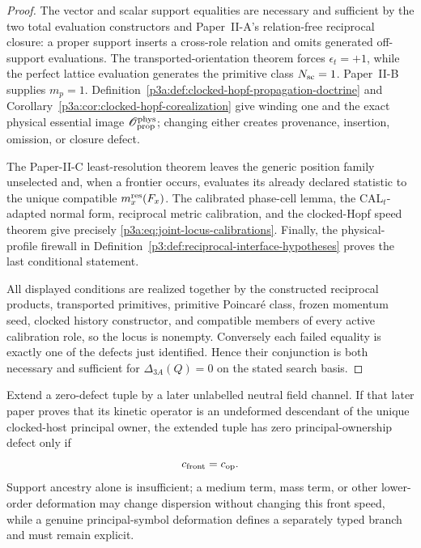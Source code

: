 \documentclass[12pt,a4paper]{article}
\begin{document}
\begin{proof}
The vector and scalar support equalities are necessary and sufficient by the
two total evaluation constructors and Paper~II-A's relation-free reciprocal
closure: a proper support inserts a cross-role relation and omits generated
off-support evaluations.  The transported-orientation theorem forces
\(\epsilon_t=+1\), while the perfect lattice evaluation generates the
primitive class \(N_{\rm sc}=1\).  Paper~II-B supplies \(m_p=1\).
Definition~\ref{p3a:def:clocked-hopf-propagation-doctrine} and
Corollary~\ref{p3a:cor:clocked-hopf-corealization} give winding one and the
exact physical essential image
\(\mathscr O_{\rm prop}^{\rm phys}\); changing either creates provenance,
insertion, omission, or closure defect.

The Paper-II-C least-resolution theorem leaves the generic position family
unselected and, when a frontier occurs, evaluates its already declared
statistic to the unique compatible \(m_x^{\rm res}(F_x)\).  The calibrated
phase-cell lemma, the CAL\(_t\)-adapted normal form, reciprocal metric
calibration, and the clocked-Hopf speed theorem give precisely
\eqref{p3a:eq:joint-locus-calibrations}.  Finally, the physical-profile
firewall in Definition~\ref{p3:def:reciprocal-interface-hypotheses} proves the
last conditional statement.

All displayed conditions are realized together by the constructed reciprocal
products, transported primitives, primitive Poincar\'e class, frozen momentum
seed, clocked history constructor, and compatible members of every active
calibration role, so
the locus is nonempty.  Conversely each failed equality is exactly one of the
defects just identified.  Hence their conjunction is both necessary and
sufficient for \(\Delta_{3A}(Q)=0\) on the stated search basis.
\end{proof}

\begin{corollary}
\label{p3a:cor:joint-locus-neutral-speed-extension}
Extend a zero-defect tuple by a later unlabelled neutral field channel.  If
that later paper proves that its kinetic operator is an undeformed descendant
of the unique clocked-host principal owner, the extended tuple has zero
principal-ownership defect only if
\[
 c_{\rm front}=c_{\rm op}.
\]
Support ancestry alone is insufficient; a medium term, mass term, or other
lower-order deformation may change dispersion without changing this front
speed, while a genuine principal-symbol deformation defines a separately
typed branch and must remain explicit.
\end{corollary}
\end{document}
